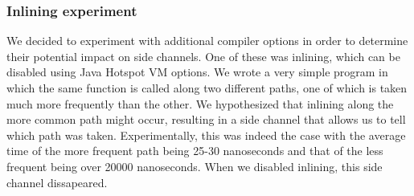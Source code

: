 \subsubsection{Inlining experiment} We decided to experiment with additional compiler options in order to determine their potential impact on side channels. One of these was inlining, which can be disabled using Java Hotspot VM options. We wrote a very simple program in which the same function is called along two different paths, one of which is taken much more frequently than the other. We hypothesized that inlining along the more common path might occur, resulting in a side channel that allows us to tell which path was taken. Experimentally, this was indeed the case with the average time of the more frequent path being 25-30 nanoseconds and that of the less frequent being over 20000 nanoseconds. When we disabled inlining, this side channel dissapeared. 